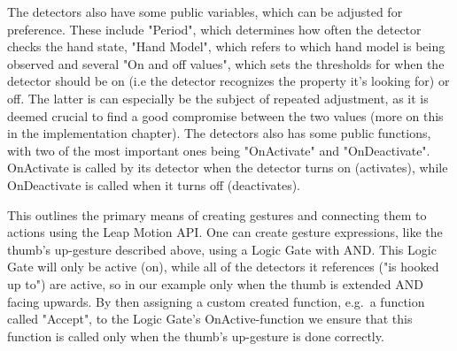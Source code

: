 The detectors also have some public variables, which can be adjusted for preference. These include "Period", which determines how often the detector checks the hand state,
"Hand Model", which refers to which hand model is being observed and several "On and off values", which sets the thresholds for when the detector should be on (i.e the
detector recognizes the property it's looking for) or off. The latter is can especially be the subject of repeated adjustment, as it is deemed crucial to find a good
compromise between the two values (more on this in the implementation chapter). The detectors also has some public functions, with two of the most important ones being
"OnActivate" and "OnDeactivate". OnActivate is called by its detector when the detector turns on (activates), while OnDeactivate is called when it turns off (deactivates). 

This outlines the primary means of creating gestures and connecting them to actions using the Leap Motion API. One can create gesture expressions, like the thumb's up-gesture
described above, using a Logic Gate with AND. This Logic Gate will only be active (on), while all of the detectors it references ("is hooked up to") are active, so in our example
only when the thumb is extended AND facing upwards. By then assigning a custom created function, e.g.~a function called "Accept", to the Logic Gate's OnActive-function we
ensure that this function is called only when the thumb's up-gesture is done correctly. 










